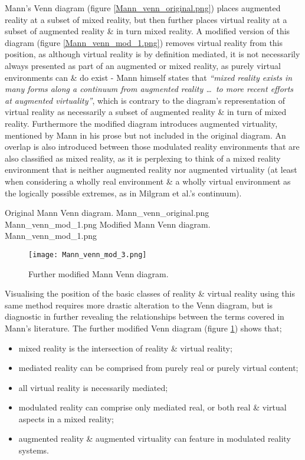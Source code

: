 
Mann's Venn diagram (figure \ref{Mann_venn_original.png}) places augmented reality at a subset of mixed reality, but then further places virtual reality at a subset of augmented reality \& in turn mixed reality. A modified version of this diagram (figure \ref{Mann_venn_mod_1.png}) removes virtual reality from this position, as although virtual reality is by definition mediated, it is not necessarily always presented as part of an augmented or mixed reality, as purely virtual environments can \& do exist - Mann himself states that \textit{``mixed reality exists in many forms along a continuum from augmented reality \ldots\ to more recent efforts at augmented virtuality''}, which is contrary to the diagram's representation of virtual reality as necessarily a subset of augmented reality \& in turn of mixed reality. Furthermore the modified diagram introduces augmented virtuality, mentioned by Mann in his prose but not included in the original diagram. An overlap is also introduced between those modulated reality environments that are also classified as mixed reality, as it is perplexing to think of a mixed reality environment that is neither augmented reality nor augmented virtuality (at least when considering a wholly real environment \& a wholly virtual environment as the logically possible extremes, as in Milgram et al.'s continuum).

 {Original Mann Venn diagram.} {Mann_venn_original.png}
       {Mann_venn_mod_1.png} {Modified Mann Venn diagram.} {Mann_venn_mod_1.png}

\begin{figure}[h]
\centering
  \texttt{[image: Mann\_venn\_mod\_3.png]}
  \caption{Further modified Mann Venn diagram.}
  \label{Mann_venn_mod_3.png}
\end{figure}

Visualising the position of the basic classes of reality \& virtual reality using this same method requires more drastic alteration to the Venn diagram, but is diagnostic in further revealing the relationships between the terms covered in Mann's literature. The further modified Venn diagram (figure \ref{Mann_venn_mod_3.png}) shows that;
\begin{itemize}
	\item mixed reality is the intersection of reality \& virtual reality;
	\item mediated reality can be comprised from purely real or purely virtual content;
	\item all virtual reality is necessarily mediated;
	\item modulated reality can comprise only mediated real, or both real \& virtual aspects in a mixed reality;
	\item augmented reality \& augmented virtuality can feature in modulated reality systems.
\end{itemize}

